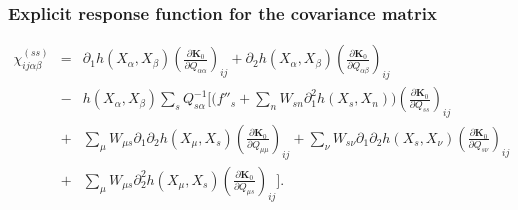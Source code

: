 \subsubsection*{Explicit response function for the covariance matrix}
\begin{eqnarray}
    \chi_{ij\alpha\beta}^{(ss)} &=& \partial_1 h(X_\alpha, X_\beta) \left( \frac{\partial \mathbf{K}_0}{\partial Q_{\alpha\alpha}} \right)_{ij} + \partial_2 h(X_\alpha, X_\beta) \left( \frac{\partial \mathbf{K}_0}{\partial Q_{\alpha\beta}} \right)_{ij}\nonumber\\
    &-& h(X_\alpha,X_\beta) \sum_s Q^{-1}_{s\alpha} \Bigg[ \Bigg( f''_s + \sum_n W_{sn} \partial^2_1 h(X_s, X_n) \Bigg) \left( \frac{\partial \mathbf{K}_0}{\partial Q_{ss}} \right)_{ij}\nonumber\\
    &+& \sum_\mu W_{\mu s} \partial_1\partial_2 h(X_\mu, X_s) \left( \frac{\partial \mathbf{K}_0}{\partial Q_{\mu\mu}} \right)_{ij} + \sum_\nu W_{s\nu} \partial_1\partial_2 h(X_s, X_\nu) \left( \frac{\partial \mathbf{K}_0}{\partial Q_{s\nu}} \right)_{ij}\nonumber\\
    &+& \sum_\mu W_{\mu s} \partial_2^2 h(X_\mu, X_s) \left( \frac{\partial \mathbf{K}_0}{\partial Q_{\mu s}} \right)_{ij} \Bigg]. \label{chiKodW_ss_appB}
\end{eqnarray}

